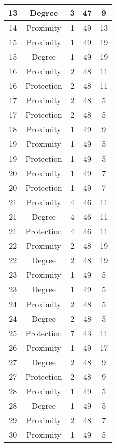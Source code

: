 \documentclass[results.tex]{subfiles}
\begin{document}
\begin{center}
\begin{tabular}{| c || c | c | c | c |}
    \hline
    13 & Degree & 3 & 47 & 9 \\ 
    \hline
    14 & Proximity & 1 & 49 & 13 \\ 
    \hline
    15 & Proximity & 1 & 49 & 19 \\ 
    \hline
    15 & Degree & 1 & 49 & 19 \\ 
    \hline
    16 & Proximity & 2 & 48 & 11 \\ 
    \hline
    16 & Protection & 2 & 48 & 11 \\ 
    \hline
    17 & Proximity & 2 & 48 & 5 \\ 
    \hline
    17 & Protection & 2 & 48 & 5 \\ 
    \hline
    18 & Proximity & 1 & 49 & 9 \\ 
    \hline
    19 & Proximity & 1 & 49 & 5 \\ 
    \hline
    19 & Protection & 1 & 49 & 5 \\ 
    \hline
    20 & Proximity & 1 & 49 & 7 \\ 
    \hline
    20 & Protection & 1 & 49 & 7 \\ 
    \hline
    21 & Proximity & 4 & 46 & 11 \\ 
    \hline
    21 & Degree & 4 & 46 & 11 \\ 
    \hline
    21 & Protection & 4 & 46 & 11 \\ 
    \hline
    22 & Proximity & 2 & 48 & 19 \\ 
    \hline
    22 & Degree & 2 & 48 & 19 \\ 
    \hline
    23 & Proximity & 1 & 49 & 5 \\ 
    \hline
    23 & Degree & 1 & 49 & 5 \\ 
    \hline
    24 & Proximity & 2 & 48 & 5 \\ 
    \hline
    24 & Degree & 2 & 48 & 5 \\ 
    \hline
    25 & Protection & 7 & 43 & 11 \\ 
    \hline
    26 & Proximity & 1 & 49 & 17 \\ 
    \hline
    27 & Degree & 2 & 48 & 9 \\ 
    \hline
    27 & Protection & 2 & 48 & 9 \\ 
    \hline
    28 & Proximity & 1 & 49 & 5 \\ 
    \hline
    28 & Degree & 1 & 49 & 5 \\ 
    \hline
    29 & Proximity & 2 & 48 & 7 \\ 
    \hline
    30 & Proximity & 1 & 49 & 5 \\ 

\end{tabular}
\end{center}
\end{document}
